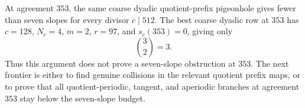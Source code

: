 \begin{remark}
At agreement \(353\), the same coarse dyadic quotient-prefix pigeonhole gives
fewer than seven slopes for every divisor \(c\mid512\).  The best coarse dyadic row at \(353\) has \(c=128\), \(N_c=4\), \(m=2\), \(r=97\), and \(s_c(353)=0\), giving only
\[
  \binom{3}{2}=3.
\]
Thus this argument does not prove a seven-slope obstruction at \(353\).  The
next frontier is either to find genuine collisions in the relevant quotient
prefix maps, or to prove that all quotient-periodic, tangent, and aperiodic
branches at agreement \(353\) stay below the seven-slope budget.
\end{remark}
